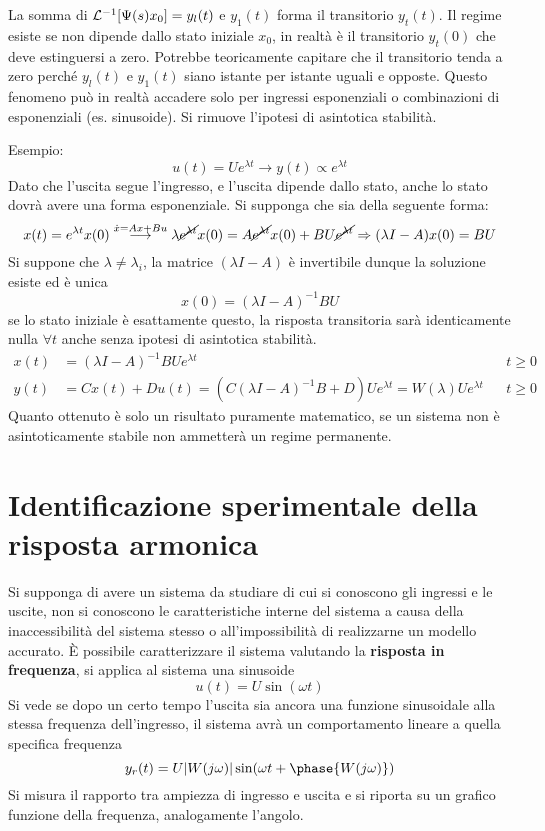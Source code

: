 La somma di $\mathcal{L}^{-1}[\Psi(s)x_0]=y_l(t)$ e $y_1(t)$ forma il transitorio
$y_t(t)$.
Il regime esiste se non dipende dallo stato iniziale $x_0$, in realtà è il
transitorio $y_t(0)$ che deve estinguersi a zero. Potrebbe teoricamente
capitare che il transitorio tenda a zero perché $y_l(t)$ e $y_1(t)$ siano
istante per istante uguali e opposte.
Questo fenomeno può in realtà accadere solo per ingressi esponenziali o
combinazioni di esponenziali (es. sinusoide).
Si rimuove l'ipotesi di asintotica stabilità.

Esempio:
$$
u(t) = Ue^{\lambda t} \longrightarrow y(t) \propto e^{\lambda t}
$$
Dato che l'uscita segue l'ingresso, e l'uscita dipende dallo stato, anche lo
stato dovrà avere una forma esponenziale. Si supponga che sia della seguente
forma:
$$
x(t) = e^{\lambda t}x(0)
\stackrel{\dot{x}=Ax+Bu}{\longrightarrow}\lambda \cancel{e^{\lambda t}}x(0) =
A\cancel{e^{\lambda t}}x(0) + BU\cancel{e^{\lambda t}} \Rightarrow (\lambda
I-A)x(0) = BU
$$
Si suppone che $\lambda \neq \lambda_i$, la matrice $(\lambda I -A)$ è
invertibile dunque la soluzione esiste ed è unica
$$
x(0) = (\lambda I -A)^{-1}BU
$$
se lo stato iniziale è esattamente questo, la risposta transitoria sarà
identicamente nulla $\forall t$ anche senza ipotesi di asintotica stabilità.
$$\begin{aligned}
x(t)  &= (\lambda I -A )^{-1}BUe^{\lambda t} &  & t\geq 0\\
y(t) &= Cx(t) +Du(t) = \left(C(\lambda I-A)^{-1}B+D\right)Ue^{\lambda t}
=W(\lambda)Ue^{\lambda t}
&  &
t\geq 0
\end{aligned}$$
Quanto ottenuto è solo un risultato puramente matematico, se un sistema non è
asintoticamente stabile non ammetterà un regime permanente.

\newpage
\section{Identificazione sperimentale della risposta armonica}
Si supponga di avere un sistema da studiare di cui si conoscono gli ingressi e
le uscite, non si conoscono le caratteristiche interne del sistema a causa
della inaccessibilità del sistema stesso o all'impossibilità di realizzarne un
modello accurato.
È possibile caratterizzare il sistema valutando la \textbf{risposta in
frequenza}, si applica al sistema una sinusoide
$$
u(t)  = U\sin(\omega t)
$$
Si vede se dopo un certo tempo l'uscita sia ancora una funzione sinusoidale
alla stessa frequenza dell'ingresso, il sistema avrà un comportamento lineare
a quella specifica frequenza
$$
y_r(t) = U|W(j \omega)|\sin(\omega t + \phase{W(j \omega)})
$$
Si misura il rapporto tra ampiezza di ingresso e uscita e si riporta su un
grafico funzione della frequenza, analogamente l'angolo.

